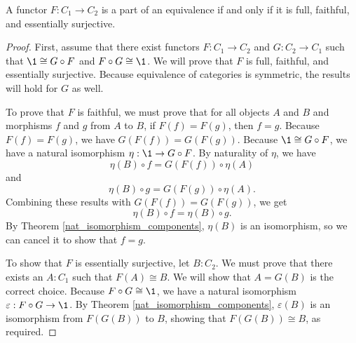 \documentclass[../math.tex]{subfiles}
\begin{document}
\begin{theorem}
    A functor $F : C_1 \to C_2$ is a part of an equivalence if and only if it is
    full, faithful, and essentially surjective.
\end{theorem}
\begin{proof}
    First, assume that there exist functors $F : C_1 \to C_2$ and $G : C_2 \to
    C_1$ such that $\1 \cong G \circ F$ and $F \circ G \cong \1$.  We will prove
    that $F$ is full, faithful, and essentially surjective.  Because equivalence
    of categories is symmetric, the results will hold for $G$ as well.

    To prove that $F$ is faithful, we must prove that for all objects $A$ and
    $B$ and morphisms $f$ and $g$ from $A$ to $B$, if $F(f) = F(g)$, then $f =
    g$.  Because $F(f) = F(g)$, we have $G(F(f)) = G(F(g))$.  Because $\1 \cong
    G \circ F$, we have a natural isomorphism $\eta : \1 \to G \circ F$.  By
    naturality of $\eta$, we have
    \[
        \eta(B) \circ f = G(F(f)) \circ \eta(A)
    \]
    and
    \[
        \eta(B) \circ g = G(F(g)) \circ \eta(A).
    \]
    Combining these results with $G(F(f)) = G(F(g))$, we get
    \[
        \eta(B) \circ f = \eta(B) \circ g.
    \]
    By Theorem \ref{nat_isomorphism_components}, $\eta(B)$ is an isomorphism, so
    we can cancel it to show that $f = g$.

    To show that $F$ is essentially surjective, let $B : C_2$.  We must prove
    that there exists an $A : C_1$ such that $F(A) \cong B$.  We will show that
    $A = G(B)$ is the correct choice.  Because $F \circ G \cong \1$, we have a
    natural isomorphism $\varepsilon : F \circ G \to \1$.  By Theorem
    \ref{nat_isomorphism_components}, $\varepsilon(B)$ is an isomorphism from
    $F(G(B))$ to $B$, showing that $F(G(B)) \cong B$, as required.


\end{proof}
\end{document}
